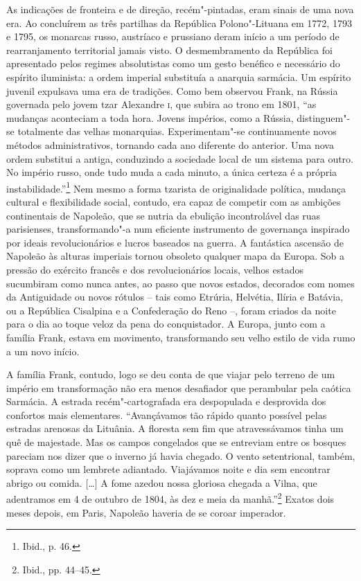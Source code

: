 As indicações de fronteira e de direção, recém"-pintadas, eram sinais de
uma nova era. Ao concluírem as três partilhas da
República Polono"-Lituana em 1772, 1793 e 1795, os monarcas russo, austríaco e prussiano deram
início a um período de rearranjamento territorial jamais visto. O
desmembramento da República foi apresentado pelos regimes absolutistas
como um gesto benéfico e necessário do espírito iluminista: a ordem
imperial substituía a anarquia sarmácia. Um espírito juvenil expulsava
uma era de tradições. Como bem observou Frank, na Rússia governada pelo
jovem tzar Alexandre \textsc{i}, que subira ao trono em 1801, ``as mudanças
aconteciam a toda hora. Jovens impérios, como a Rússia, distinguem"-se
totalmente das velhas monarquias. Experimentam"-se continuamente novos
métodos administrativos, tornando cada ano diferente do anterior. Uma
nova ordem substitui a antiga, conduzindo a sociedade local de um
sistema para outro. No império russo, onde tudo muda a cada minuto, a
única certeza é a própria instabilidade.''\footnote{Ibid., p. 46.} Nem
mesmo a forma tzarista de originalidade política, mudança cultural e
flexibilidade social, contudo, era capaz de competir com as ambições
continentais de Napoleão, que se nutria da ebulição incontrolável das
ruas parisienses, transformando"-a num eficiente instrumento de
governança inspirado por ideais revolucionários e lucros baseados na
guerra. A fantástica ascensão de Napoleão às alturas imperiais tornou
obsoleto qualquer mapa da Europa. Sob a pressão do exército francês e
dos revolucionários locais, velhos estados sucumbiram como nunca antes,
ao passo que novos estados, decorados com nomes da Antiguidade ou novos
rótulos -- tais como Etrúria, Helvétia, Ilíria e Batávia, ou a República
Cisalpina e a Confederação do Reno --, foram criados da noite para o dia
ao toque veloz da pena do conquistador. A Europa, junto com a família
Frank, estava em movimento, transformando seu velho estilo de vida rumo
a um novo início.

A família Frank, contudo, logo se deu conta de que viajar pelo terreno
de um império em transformação não era menos desafiador que perambular
pela caótica Sarmácia. A estrada recém"-cartografada era despopulada e
desprovida dos confortos mais elementares. ``Avançávamos tão rápido
quanto possível pelas estradas arenosas da Lituânia. A floresta sem fim
que atravessávamos tinha um quê de majestade. Mas os campos congelados
que se entreviam entre os bosques pareciam nos dizer que o inverno já
havia chegado. O vento setentrional, também, soprava como um lembrete
adiantado. Viajávamos noite e dia sem encontrar abrigo ou comida.
{[}\ldots{}{]} A fome azedou nossa gloriosa chegada a Vilna, que
adentramos em 4 de outubro de 1804, às dez e meia da manhã.''\footnote{Ibid., pp. 44--45.} Exatos dois meses depois, em Paris, Napoleão haveria de se coroar imperador.

